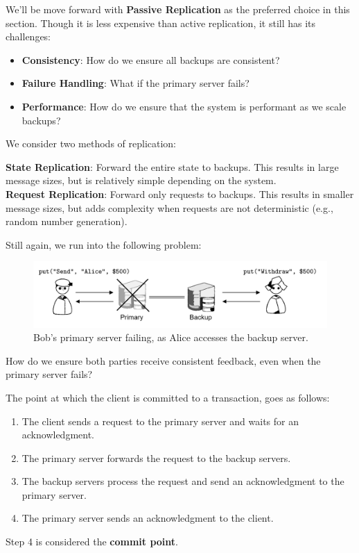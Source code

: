\newpage 

\noindent
We'll be move forward with \textbf{Passive Replication} as the preferred choice in this section.
Though it is less expensive than active replication, it still has its challenges:
\begin{itemize}
    \item \textbf{Consistency}: How do we ensure all backups are consistent?
    \item \textbf{Failure Handling}: What if the primary server fails?
    \item \textbf{Performance}: How do we ensure that the system is performant as we scale backups?
\end{itemize}

\noindent
We consider two methods of replication:
\begin{Def}

    \textbf{State Replication}: Forward the entire state to backups. This results in large message sizes, but is relatively simple depending on the system.\\

    \noindent 
    \textbf{Request Replication}: Forward only requests to backups. This results in smaller message sizes, but adds complexity when requests are not deterministic (e.g., random number generation).
\end{Def}

\noindent
Still again, we run into the following problem:
\begin{figure}[h]
    \centering
    \includegraphics[width=.9\textwidth]{Sections/rep/primary.png}
    \caption{Bob's primary server failing, as Alice accesses the backup server.}
\end{figure}

\noindent
How do we ensure both parties receive consistent feedback, even when the primary server fails?
\begin{Def}

    The point at which the client is committed to a transaction, goes as follows:
    \begin{enumerate}
        \item The client sends a request to the primary server and waits for an acknowledgment.
        \item The primary server forwards the request to the backup servers.
        \item The backup servers process the request and send an acknowledgment to the primary server.
        \item The primary server sends an acknowledgment to the client.
    \end{enumerate}

    \noindent
    Step 4 is considered the \textbf{commit point}.
\end{Def}

